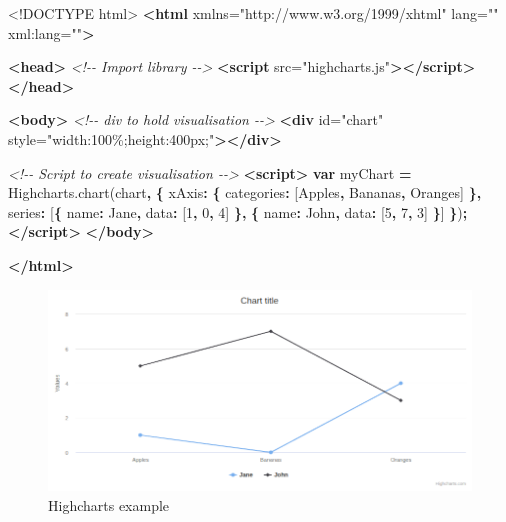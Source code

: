 \documentclass[
]{krantz}
\makeatletter
\newenvironment{Shaded}{\begin{snugshade}}{\end{snugshade}}
\newcommand{\AttributeTok}[1]{\textcolor[rgb]{0.61,0.61,0.61}{#1}}
\newcommand{\CommentTok}[1]{\textcolor[rgb]{0.37,0.37,0.37}{\textit{#1}}}
\newcommand{\DataTypeTok}[1]{\textcolor[rgb]{0.27,0.27,0.27}{#1}}
\newcommand{\DecValTok}[1]{\textcolor[rgb]{0.06,0.06,0.06}{#1}}
\newcommand{\KeywordTok}[1]{\textcolor[rgb]{0.27,0.27,0.27}{\textbf{#1}}}
\newcommand{\NormalTok}[1]{#1}
\newcommand{\OperatorTok}[1]{\textcolor[rgb]{0.43,0.43,0.43}{\textbf{#1}}}
\newcommand{\OtherTok}[1]{\textcolor[rgb]{0.37,0.37,0.37}{#1}}
\newcommand{\StringTok}[1]{\textcolor[rgb]{0.5,0.5,0.5}{#1}}
\newcommand{\VariableTok}[1]{\textcolor[rgb]{0,0,0}{#1}}
\newenvironment{kframe}{%
\medskip{}
\setlength{\fboxsep}{.8em}
 \def\at@end@of@kframe{}%
 \ifinner\ifhmode%
  \def\at@end@of@kframe{\end{minipage}}%
  \begin{minipage}{\columnwidth}%
 \fi\fi%
 \def\FrameCommand##1{\hskip\@totalleftmargin \hskip-\fboxsep
 \colorbox{shadecolor}{##1}\hskip-\fboxsep
     \hskip-\linewidth \hskip-\@totalleftmargin \hskip\columnwidth}%
 \MakeFramed {\advance\hsize-\width
   \@totalleftmargin\z@ \linewidth\hsize
   \@setminipage}}%
 {\par\unskip\endMakeFramed%
 \at@end@of@kframe}
\renewenvironment{Shaded}{\begin{kframe}}{\end{kframe}}
\makeatother
\begin{document}
\begin{Shaded}
\begin{Highlighting}[]
\DataTypeTok{<!DOCTYPE }\NormalTok{html}\DataTypeTok{>}
\KeywordTok{<html}\OtherTok{ xmlns=}\StringTok{"http://www.w3.org/1999/xhtml"}\OtherTok{ lang=}\StringTok{""}\OtherTok{ xml:lang=}\StringTok{""}\KeywordTok{>}

\KeywordTok{<head>}
  \CommentTok{<!{-}{-} Import library {-}{-}>}
  \KeywordTok{<script}\OtherTok{ src=}\StringTok{"highcharts.js"}\KeywordTok{></script>}
\KeywordTok{</head>}

\KeywordTok{<body>}
  \CommentTok{<!{-}{-} div to hold visualisation {-}{-}>}
  \KeywordTok{<div}\OtherTok{ id=}\StringTok{"chart"}\OtherTok{ style=}\StringTok{"width:100\%;height:400px;"}\KeywordTok{></div>}

  \CommentTok{<!{-}{-} Script to create visualisation {-}{-}>}
  \KeywordTok{<script>}
    \KeywordTok{var}\NormalTok{ myChart }\OperatorTok{=} \VariableTok{Highcharts}\NormalTok{.}\AttributeTok{chart}\NormalTok{(}\StringTok{\textquotesingle{}chart\textquotesingle{}}\OperatorTok{,} \OperatorTok{\{}
        \DataTypeTok{xAxis}\OperatorTok{:} \OperatorTok{\{}
            \DataTypeTok{categories}\OperatorTok{:}\NormalTok{ [}\StringTok{\textquotesingle{}Apples\textquotesingle{}}\OperatorTok{,} \StringTok{\textquotesingle{}Bananas\textquotesingle{}}\OperatorTok{,} \StringTok{\textquotesingle{}Oranges\textquotesingle{}}\NormalTok{]}
        \OperatorTok{\},}
        \DataTypeTok{series}\OperatorTok{:}\NormalTok{ [}\OperatorTok{\{}
            \DataTypeTok{name}\OperatorTok{:} \StringTok{\textquotesingle{}Jane\textquotesingle{}}\OperatorTok{,}
            \DataTypeTok{data}\OperatorTok{:}\NormalTok{ [}\DecValTok{1}\OperatorTok{,} \DecValTok{0}\OperatorTok{,} \DecValTok{4}\NormalTok{]}
        \OperatorTok{\},} \OperatorTok{\{}
            \DataTypeTok{name}\OperatorTok{:} \StringTok{\textquotesingle{}John\textquotesingle{}}\OperatorTok{,}
            \DataTypeTok{data}\OperatorTok{:}\NormalTok{ [}\DecValTok{5}\OperatorTok{,} \DecValTok{7}\OperatorTok{,} \DecValTok{3}\NormalTok{]}
        \OperatorTok{\}}\NormalTok{]}
    \OperatorTok{\}}\NormalTok{)}\OperatorTok{;}
  \KeywordTok{</script>}
\KeywordTok{</body>}

\KeywordTok{</html>}
\end{Highlighting}
\end{Shaded}

\begin{figure}
\centering
\includegraphics{images/candidate-highcharts.png}
\caption{Highcharts example}
\end{figure}
\end{document}
